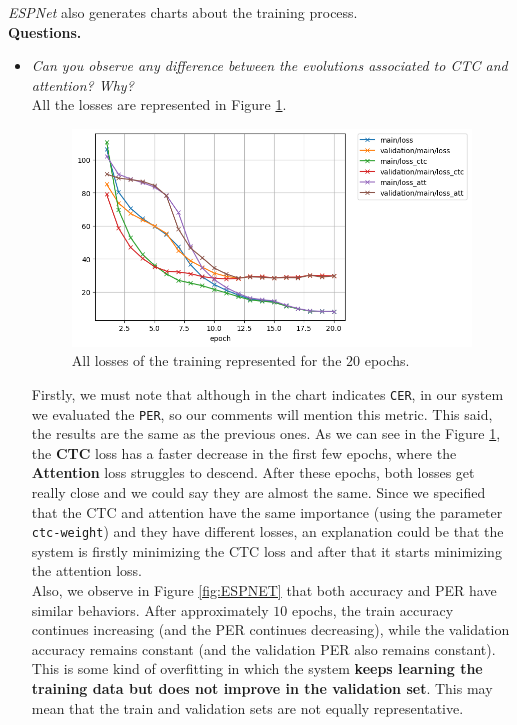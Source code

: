 \documentclass[a4paper]{article}
\def\inline{\lstinline[basicstyle=\ttfamily,keywordstyle={}]}
\begin{document}
\emph{ESPNet} also generates charts about the training process.\\

\textbf{Questions.}
\begin{itemize}
  \item \emph{Can you observe any difference between the evolutions associated to CTC and attention? Why?}\\

        All the losses are represented in Figure \ref{fig:all:losses}.
        \begin{figure}[H]
          \centering
          \includegraphics[scale=0.6]{Figures/loss.png}
          \caption{All losses of the training represented for the \(20\) epochs.}
          \label{fig:all:losses}
        \end{figure}
        Firstly, we must note that although in the chart indicates \inline{CER}, in our system we evaluated the \inline{PER}, so our comments will mention this metric. This said, the results are the same as the previous ones. As we can see in the Figure \ref{fig:all:losses}, the \textbf{CTC} loss has a faster decrease in the first few epochs, where the \textbf{Attention} loss struggles to descend. After these epochs, both losses get really close and we could say they are almost the same. Since we specified that the CTC and attention have the same importance (using the parameter \inline{ctc-weight}) and they have different losses, an explanation could be that the system is firstly minimizing the CTC loss and after that it starts minimizing the attention loss.\\

        Also, we observe in Figure \ref{fig:ESPNET} that both accuracy and PER have similar behaviors. After approximately \(10\) epochs, the train accuracy continues increasing (and the PER continues decreasing), while the validation accuracy remains constant (and the validation PER also remains constant). This is some kind of overfitting in which the system \textbf{keeps learning the training data but does not improve in the validation set}. This may mean that the train and validation sets are not equally representative.



\end{itemize}
\end{document}

